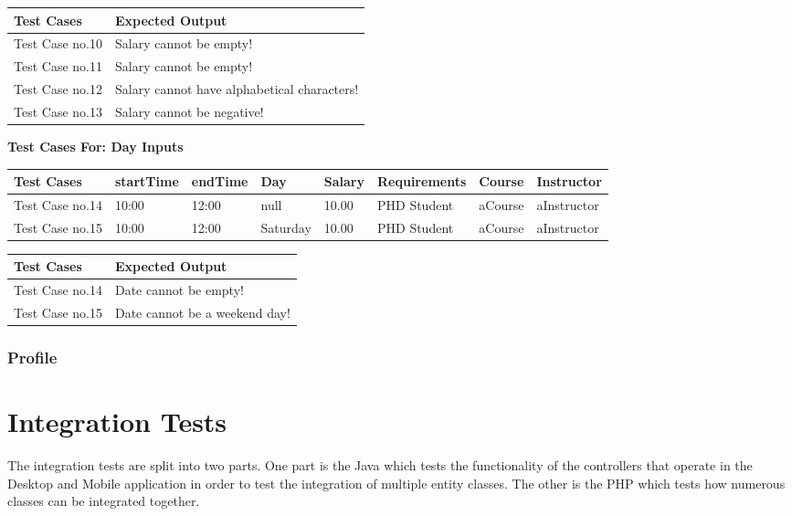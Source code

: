 \documentclass[12pt]{report}
\begin{document}
	\begin{flushleft}
		\begin{tabular}{ | l | l | }
			\hline
			Test Cases & Expected Output \\ \hline
			Test Case no.10 & Salary cannot be empty! \\ \hline
			Test Case no.11 & Salary cannot be empty! \\ \hline
			Test Case no.12 & Salary cannot have alphabetical characters! \\ \hline
			Test Case no.13 & Salary cannot be negative! \\ \hline
		\end{tabular}
	\end{flushleft}

	\textbf{Test Cases For: Day Inputs}
	\begin{flushleft}
		\begin{tabular}{ | l | l | l | l | l | l | l | l | }
			\hline
			Test Cases & startTime & endTime & Day & Salary & Requirements & Course & Instructor \\ \hline
			Test Case no.14 & 10:00 & 12:00 & null & 10.00 & PHD Student & aCourse & aInstructor \\ \hline
			Test Case no.15 & 10:00 & 12:00 & Saturday & 10.00 & PHD Student & aCourse & aInstructor \\ \hline
		\end{tabular}
	\end{flushleft}
	
	\begin{flushleft}
		\begin{tabular}{ | l | l | }
			\hline
			Test Cases & Expected Output \\ \hline
			Test Case no.14 & Date cannot be empty! \\ \hline
			Test Case no.15 & Date cannot be a weekend day! \\ \hline
		\end{tabular}
	\end{flushleft}

\newpage
\section{Profile}

\part{Integration Tests}
The integration tests are split into two parts. One part is the Java which tests the functionality of the controllers that operate in the Desktop and Mobile application in order to test the integration of multiple entity classes. The other is the PHP which tests how numerous classes can be integrated together. 
\end{document}
